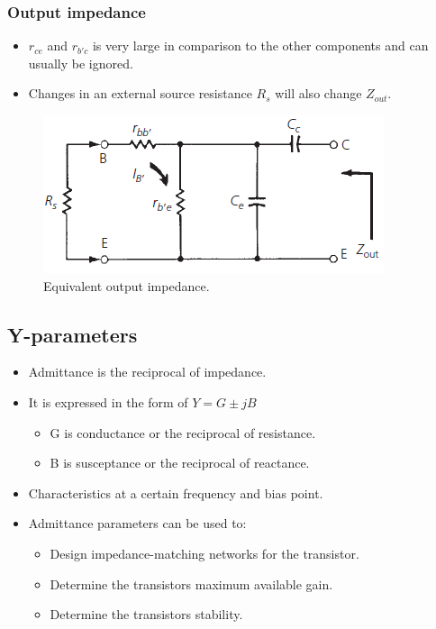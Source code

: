\subsubsection{Output impedance}

\begin{itemize}
	\item $r_{ce}$ and $r_{b'c}$ is very large in comparison to the other components and can usually be ignored.
	\item Changes in an external source resistance $R_s$ will also change $Z_{out}$.
\end{itemize}

\begin{figure} [H]
	\centering
	\includegraphics[width=0.6\linewidth]{graphics/35.png}
	\caption{Equivalent output impedance.}
	\label{fig:35}
\end{figure}


\subsection{Y-parameters}
\begin{itemize}
	\item Admittance is the reciprocal of impedance.
	\item It is expressed in the form of $Y =G\pm jB$
	\begin{itemize}
		\item G is conductance or the reciprocal of resistance.
		\item B is susceptance or the reciprocal of reactance.
	\end{itemize} 
	\item Characteristics at a certain frequency and bias point.
	\item Admittance parameters can be used to:
	\begin{itemize}
		\item Design impedance-matching networks for the transistor.
		\item Determine the transistors maximum available gain.
		\item Determine the transistors stability.
	\end{itemize}
\end{itemize}

